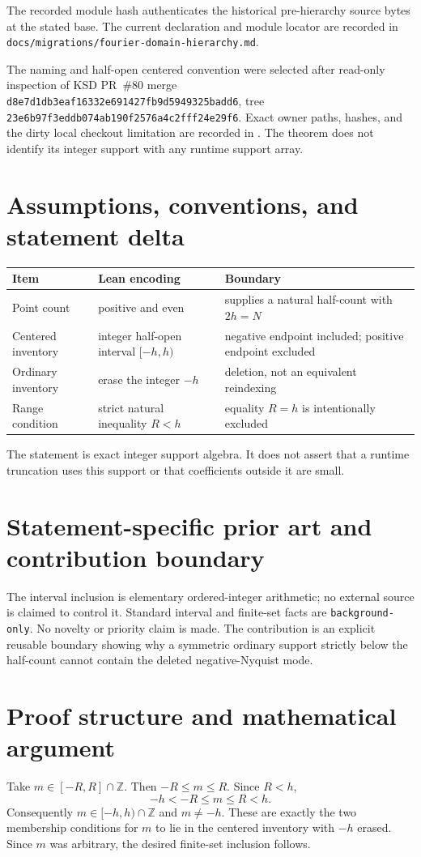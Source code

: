 \documentclass[11pt]{article}
\begin{document}
The recorded module hash authenticates the historical pre-hierarchy source bytes at the stated base. The current declaration and module locator are recorded in \texttt{docs/migrations/fourier-domain-hierarchy.md}.

The naming and half-open centered convention were selected after read-only inspection of KSD
PR~\#80 merge \texttt{d8e7d1db3eaf16332e691427fb9d5949325badd6}, tree
\texttt{23e6b97f3eddb074ab190f2576a4c2fff24e29f6}.  Exact owner paths, hashes, and the dirty local
checkout limitation are recorded in .  The theorem does not identify
its integer support with any runtime support array.

\section{Assumptions, conventions, and statement delta}
\begin{tabularx}{\textwidth}{@{}lXX@{}}
\toprule
Item & Lean encoding & Boundary \\
\midrule
Point count & positive and even & supplies a natural half-count with $2h=N$ \\
Centered inventory & integer half-open interval $[-h,h)$ & negative endpoint included; positive endpoint excluded \\
Ordinary inventory & erase the integer $-h$ & deletion, not an equivalent reindexing \\
Range condition & strict natural inequality $R<h$ & equality $R=h$ is intentionally excluded \\
\bottomrule
\end{tabularx}
The statement is exact integer support algebra.  It does not assert that a runtime truncation uses
this support or that coefficients outside it are small.

\section{Statement-specific prior art and contribution boundary}
The interval inclusion is elementary ordered-integer arithmetic; no external source is claimed to
control it.  Standard interval and finite-set facts are \texttt{background-only}.  No novelty or
priority claim is made.  The contribution is an explicit reusable boundary showing why a symmetric
ordinary support strictly below the half-count cannot contain the deleted negative-Nyquist mode.

\section{Proof structure and mathematical argument}
Take $m\in[-R,R]\cap\mathbb Z$.  Then $-R\le m\le R$.  Since $R<h$,
\[
 -h<-R\le m\le R<h.
\]
Consequently $m\in[-h,h)\cap\mathbb Z$ and $m\ne-h$.  These are exactly the two membership
conditions for $m$ to lie in the centered inventory with $-h$ erased.  Since $m$ was arbitrary,
the desired finite-set inclusion follows.
\end{document}
